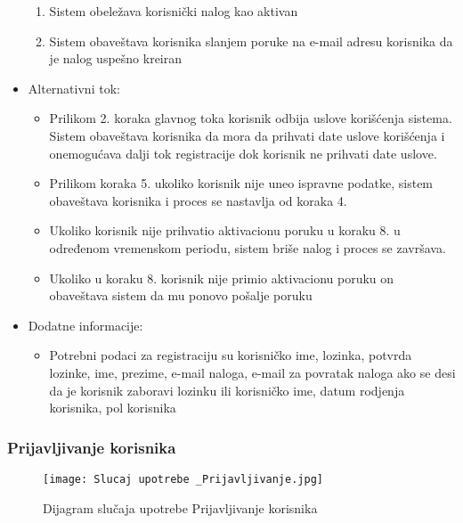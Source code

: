 \documentclass[a4paper]{article}
\begin{document}
\begin{itemize}
\begin{enumerate}
            \item Sistem obeležava korisnički nalog kao aktivan
            \item Sistem obaveštava korisnika slanjem poruke na e-mail adresu korisnika da je nalog uspešno kreiran 
        \end{enumerate}
    \item Alternativni tok:
        \begin{itemize}
            \item Prilikom 2. koraka glavnog toka korisnik odbija uslove korišćenja sistema. Sistem obaveštava korisnika da mora da prihvati date uslove korišćenja i onemogućava dalji tok registracije dok korisnik ne prihvati date uslove.
            \item Prilikom koraka 5. ukoliko korisnik nije uneo ispravne podatke, sistem obaveštava korisnika i proces se nastavlja od koraka 4.
            \item Ukoliko korisnik nije prihvatio aktivacionu poruku u koraku 8. u određenom vremenskom periodu, sistem briše nalog i proces se završava.
            \item Ukoliko u koraku 8. korisnik nije primio aktivacionu poruku on obaveštava sistem da mu ponovo pošalje poruku
        \end{itemize}
    \item Dodatne informacije:
        \begin{itemize}
            \item Potrebni podaci za registraciju su korisničko ime, lozinka, potvrda lozinke, ime, prezime, e-mail naloga, e-mail za povratak naloga ako se desi da je korisnik zaboravi lozinku ili korisničko ime, datum rodjenja korisnika, pol korisnika
        \end{itemize}
\end{itemize}


\subsubsection{Prijavljivanje korisnika}

\begin{figure}[htp]
    \centering
    \texttt{[image: Slucaj upotrebe \_Prijavljivanje.jpg]}
    \caption{Dijagram slučaja upotrebe Prijavljivanje korisnika}
    \label{fig:Prijavljivanje}
\end{figure}
\end{document}
